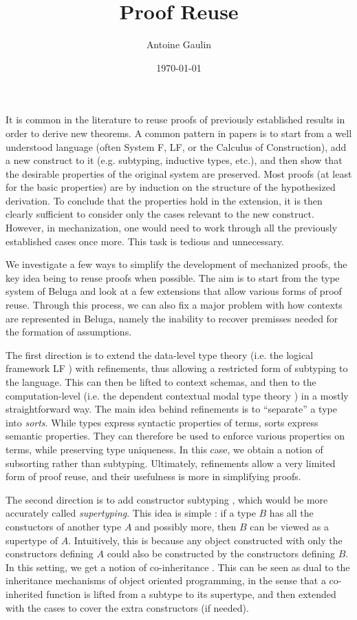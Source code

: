 \documentclass[letterpaper, 11pt]{article}
\title{Proof Reuse}
\date{\today}
\author{Antoine Gaulin}
\begin{document}
    \maketitle

    It is common in the literature to reuse proofs of previously established results in order to derive new theorems.  A common pattern in papers
    is to start from a well understood language (often System F, LF, or the Calculus of Construction), add a new construct to it (e.g. subtyping,
    inductive types, etc.), and then show that the desirable properties of the original system are preserved.  Most proofs (at least for the basic
    properties) are by induction on the structure of the hypothesized derivation.  To conclude that the properties hold in the extension, it is then
    clearly sufficient to consider only the cases relevant to the new construct.  However, in mechanization, one would need to work through all the
    previously established cases once more.  This task is tedious and unnecessary.

    We investigate a few ways to simplify the development of mechanized proofs, the key idea being to reuse proofs when possible.
    The aim is to start from the type system of Beluga \cite{Pientka2008, PientkaDunfield2008} and look at a few extensions that allow 
    various forms of proof reuse.
    Through this process, we can also fix a major problem with how contexts are represented in Beluga, namely the inability to
    recover premisses needed for the formation of assumptions.

    The first direction is to extend the data-level type theory (i.e. the logical framework LF \cite{LF1987}) with refinements, 
    thus allowing a restricted form of subtyping to the language.
    This can then be lifted to context schemas, and then to the computation-level (i.e. the dependent contextual modal type theory \cite{Nanevski2008})
    in a mostly straightforward way.  The main idea behind refinements is to ``separate'' a type into \textit{sorts}.  While types express
    syntactic properties of terms, sorts express semantic properties.  They can therefore be used to enforce various properties on terms,
    while preserving type uniqueness.  In this case, we obtain a notion of subsorting rather than subtyping.  Ultimately, refinements allow
    a very limited form of proof reuse, and their usefulness is more in simplifying proofs.
    
    The second direction is to add constructor subtyping \cite{Poll1997, BarthesFrade1999}, which would be more accurately called \textit{supertyping}.
    This idea is simple : if a type $B$ has all the constuctors of another type $A$ and possibly more, then $B$ can be viewed as a supertype of $A$.
    Intuitively, this is because any object constructed with only the constructors defining $A$ could also be constructed by the constructors defining $B$.
    In this setting, we get a notion of co-inheritance \cite{Poll1997}.  This can be seen as dual to the inheritance mechanisms of object oriented programming,
    in the sense that a co-inherited function is lifted from a subtype to its supertype, and then extended with the cases to cover the extra constructors (if needed).
    
\end{document}

